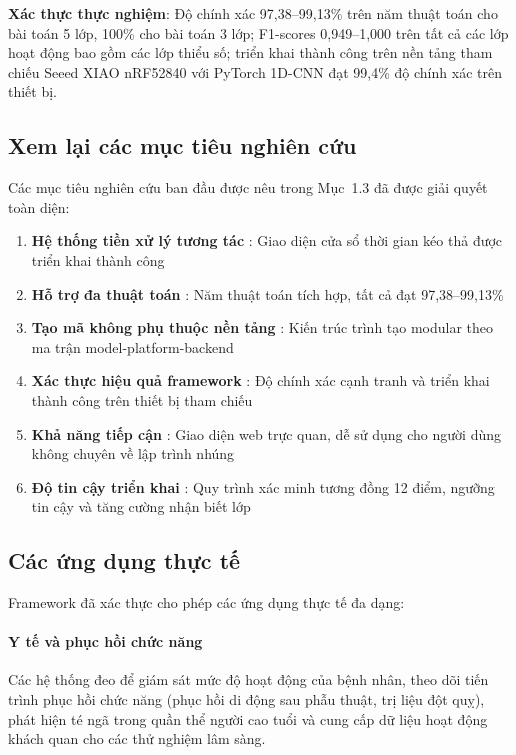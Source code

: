 \textbf{Xác thực thực nghiệm}: Độ chính xác 97,38--99,13\% trên năm thuật toán cho bài toán 5 lớp, 100\% cho bài toán 3 lớp; F1-scores 0,949--1,000 trên tất cả các lớp hoạt động bao gồm các lớp thiểu số; triển khai thành công trên nền tảng tham chiếu Seeed XIAO nRF52840 với PyTorch 1D-CNN đạt 99,4\% độ chính xác trên thiết bị.

\subsection{Xem lại các mục tiêu nghiên cứu}
Các mục tiêu nghiên cứu ban đầu được nêu trong Mục~1.3 đã được giải quyết toàn diện:
\begin{enumerate}
    \item \textbf{Hệ thống tiền xử lý tương tác} \checkmark: Giao diện cửa sổ thời gian kéo thả được triển khai thành công
    \item \textbf{Hỗ trợ đa thuật toán} \checkmark: Năm thuật toán tích hợp, tất cả đạt 97,38--99,13\%
    \item \textbf{Tạo mã không phụ thuộc nền tảng} \checkmark: Kiến trúc trình tạo modular theo ma trận model-platform-backend
    \item \textbf{Xác thực hiệu quả framework} \checkmark: Độ chính xác cạnh tranh và triển khai thành công trên thiết bị tham chiếu
    \item \textbf{Khả năng tiếp cận} \checkmark: Giao diện web trực quan, dễ sử dụng cho người dùng không chuyên về lập trình nhúng
    \item \textbf{Độ tin cậy triển khai} \checkmark: Quy trình xác minh tương đồng 12 điểm, ngưỡng tin cậy và tăng cường nhận biết lớp
\end{enumerate}

\subsection{Các ứng dụng thực tế}
Framework đã xác thực cho phép các ứng dụng thực tế đa dạng:

\paragraph{Y tế và phục hồi chức năng}
Các hệ thống đeo để giám sát mức độ hoạt động của bệnh nhân, theo dõi tiến trình phục hồi chức năng (phục hồi di động sau phẫu thuật, trị liệu đột quỵ), phát hiện té ngã trong quần thể người cao tuổi và cung cấp dữ liệu hoạt động khách quan cho các thử nghiệm lâm sàng.

